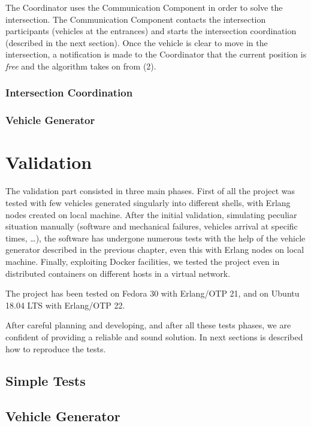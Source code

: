 \documentclass{memoir}
\begin{document}
The Coordinator uses the Communication Component in order to solve the intersection. The Communication Component contacts the intersection participants (vehicles at the entrances) and starts the intersection coordination (described in the next section). Once the vehicle is clear to move in the intersection, a notification is made to the Coordinator that the current position is \textit{free} and the algorithm takes on from (2).

\subsection{Intersection Coordination}

\subsection{Vehicle Generator}


\chapter{Validation}
The validation part consisted in three main phases. First of all the project was tested with few vehicles generated singularly into different shells, with Erlang nodes created on local machine. After the initial validation, simulating peculiar situation manually (software and mechanical failures, vehicles arrival at specific times, \dots), the software has undergone numerous tests with the help of the vehicle generator described in the previous chapter, even this with Erlang nodes on local machine. Finally, exploiting Docker facilities, we tested the project even in distributed containers on different hosts in a virtual network.

The project has been tested on Fedora 30 with Erlang/OTP 21, and on Ubuntu 18.04 LTS with Erlang/OTP 22.

After careful planning and developing, and after all these tests phases, we are confident of providing a reliable and sound solution. In next sections is described how to reproduce the tests.

\section{Simple Tests}

\section{Vehicle Generator}
\end{document}

